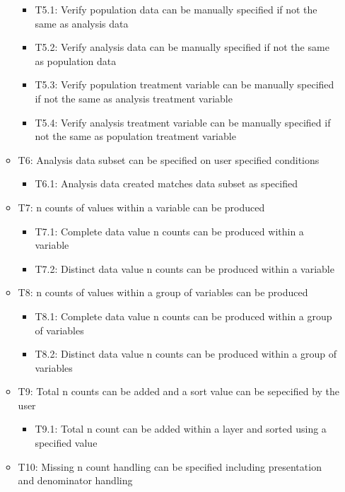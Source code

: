\documentclass[
]{article}
\providecommand{\tightlist}{%
  \setlength{\itemsep}{0pt}\setlength{\parskip}{0pt}}
\begin{document}
\begin{itemize}
\begin{itemize}
    \begin{itemize}
    \tightlist
    \item
      T5.1: Verify population data can be manually specified if not the
      same as analysis data
    \item
      T5.2: Verify analysis data can be manually specified if not the
      same as population data
    \item
      T5.3: Verify population treatment variable can be manually
      specified if not the same as analysis treatment variable
    \item
      T5.4: Verify analysis treatment variable can be manually specified
      if not the same as population treatment variable
    \end{itemize}
  \item
    T6: Analysis data subset can be specified on user specified
    conditions

    \begin{itemize}
    \tightlist
    \item
      T6.1: Analysis data created matches data subset as specified
    \end{itemize}
  \item
    T7: n counts of values within a variable can be produced

    \begin{itemize}
    \tightlist
    \item
      T7.1: Complete data value n counts can be produced within a
      variable
    \item
      T7.2: Distinct data value n counts can be produced within a
      variable
    \end{itemize}
  \item
    T8: n counts of values within a group of variables can be produced

    \begin{itemize}
    \tightlist
    \item
      T8.1: Complete data value n counts can be produced within a group
      of variables
    \item
      T8.2: Distinct data value n counts can be produced within a group
      of variables
    \end{itemize}
  \item
    T9: Total n counts can be added and a sort value can be sepecified
    by the user

    \begin{itemize}
    \tightlist
    \item
      T9.1: Total n count can be added within a layer and sorted using a
      specified value
    \end{itemize}
  \item
    T10: Missing n count handling can be specified including
    presentation and denominator handling


\end{itemize}
\end{itemize}
\end{document}
